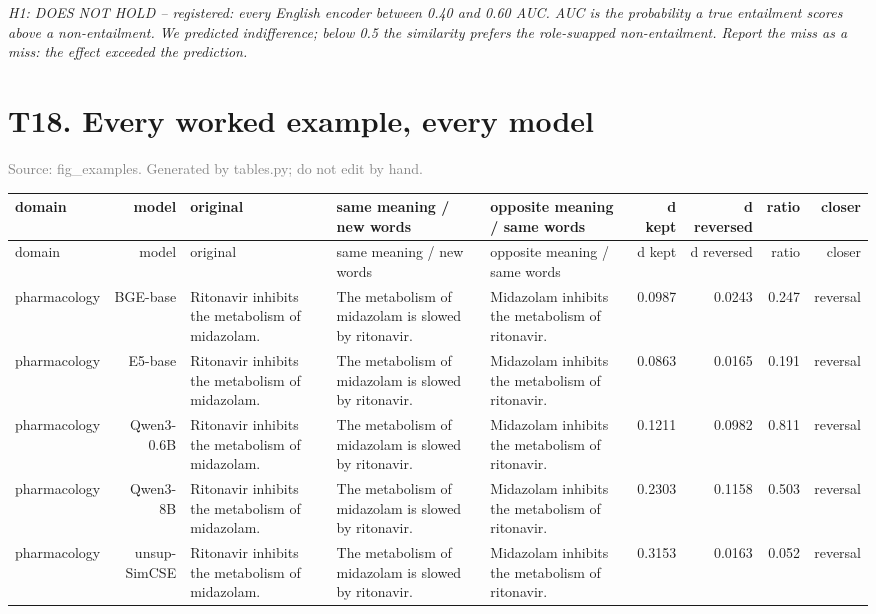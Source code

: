 \documentclass[10pt]{article}
\begin{document}
\textit{H1: DOES NOT HOLD -- registered: every English encoder between 0.40 and 0.60 AUC. AUC is the probability a true entailment scores above a non-entailment. We predicted indifference; below 0.5 the similarity prefers the role-swapped non-entailment. Report the miss as a miss: the effect exceeded the prediction.}
\clearpage

\section*{T18. Every worked example, every model}
\textcolor{gray}{Source: fig\_examples. Generated by tables.py; do not edit by hand.}

\footnotesize
\begin{longtable}{lr>{\raggedright\arraybackslash}p{4.6cm}>{\raggedright\arraybackslash}p{4.6cm}>{\raggedright\arraybackslash}p{4.6cm}rrrr}
\toprule
domain & model & original & same meaning / new words & opposite meaning / same words & d kept & d reversed & ratio & closer \\
\midrule
\endfirsthead
\toprule
domain & model & original & same meaning / new words & opposite meaning / same words & d kept & d reversed & ratio & closer \\
\midrule
\endhead
\bottomrule
\endfoot
pharmacology & BGE-base & Ritonavir inhibits the metabolism of midazolam. & The metabolism of midazolam is slowed by ritonavir. & Midazolam inhibits the metabolism of ritonavir. & 0.0987 & 0.0243 & 0.247 & reversal \\
pharmacology & E5-base & Ritonavir inhibits the metabolism of midazolam. & The metabolism of midazolam is slowed by ritonavir. & Midazolam inhibits the metabolism of ritonavir. & 0.0863 & 0.0165 & 0.191 & reversal \\
pharmacology & Qwen3-0.6B & Ritonavir inhibits the metabolism of midazolam. & The metabolism of midazolam is slowed by ritonavir. & Midazolam inhibits the metabolism of ritonavir. & 0.1211 & 0.0982 & 0.811 & reversal \\
pharmacology & Qwen3-8B & Ritonavir inhibits the metabolism of midazolam. & The metabolism of midazolam is slowed by ritonavir. & Midazolam inhibits the metabolism of ritonavir. & 0.2303 & 0.1158 & 0.503 & reversal \\
pharmacology & unsup-SimCSE & Ritonavir inhibits the metabolism of midazolam. & The metabolism of midazolam is slowed by ritonavir. & Midazolam inhibits the metabolism of ritonavir. & 0.3153 & 0.0163 & 0.052 & reversal \\

\end{longtable}
\end{document}
